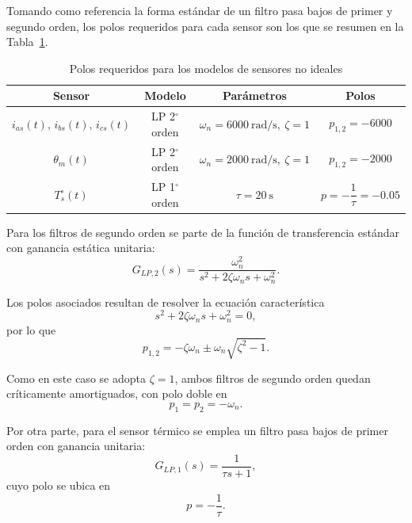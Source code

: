 \documentclass[12pt, a4paper,journal, onecolumn, compsoc]{IEEEtran}
\begin{document}
Tomando como referencia la forma estándar de un filtro pasa bajos de primer y segundo orden, los polos requeridos para cada sensor son los que se resumen en la Tabla~\ref{tab:polos_sensores}.

\begin{table}[H]
    \centering
    \caption{Polos requeridos para los modelos de sensores no ideales}
    \label{tab:polos_sensores}
    \begin{tabular}{|c|c|c|c|}
        \hline
        \textbf{Sensor} & \textbf{Modelo} & \textbf{Parámetros} & \textbf{Polos} \\
        \hline
        $i_{as}(t),\,i_{bs}(t),\,i_{cs}(t)$ 
        & LP 2$^\circ$ orden 
        & $\omega_n=6000\ \text{rad/s},\ \zeta=1$ 
        & $p_{1,2}=-6000$ \\
        \hline
        $\theta_m(t)$ 
        & LP 2$^\circ$ orden 
        & $\omega_n=2000\ \text{rad/s},\ \zeta=1$ 
        & $p_{1,2}=-2000$ \\
        \hline
        $T_s^\circ(t)$ 
        & LP 1$^\circ$ orden 
        & $\tau=20\ \text{s}$ 
        & $p=-\dfrac{1}{\tau}=-0.05$ \\
        \hline
    \end{tabular}
\end{table}

Para los filtros de segundo orden se parte de la función de transferencia estándar con ganancia estática unitaria:
\begin{equation}
    G_{LP,2}(s)=\frac{\omega_n^2}{s^2+2\zeta\omega_n s+\omega_n^2}.
    \label{eq:lp2_tf}
\end{equation}

Los polos asociados resultan de resolver la ecuación característica
\begin{equation}
    s^2+2\zeta\omega_n s+\omega_n^2=0,
\end{equation}
por lo que
\begin{equation}
    p_{1,2}=-\zeta\omega_n\pm\omega_n\sqrt{\zeta^2-1}.
\end{equation}

Como en este caso se adopta $\zeta=1$, ambos filtros de segundo orden quedan críticamente amortiguados, con polo doble en
\begin{equation}
    p_1=p_2=-\omega_n.
\end{equation}

Por otra parte, para el sensor térmico se emplea un filtro pasa bajos de primer orden con ganancia unitaria:
\begin{equation}
    G_{LP,1}(s)=\frac{1}{\tau s+1},
    \label{eq:lp1_tf}
\end{equation}
cuyo polo se ubica en
\begin{equation}
    p=-\frac{1}{\tau}.
\end{equation}
\end{document}
